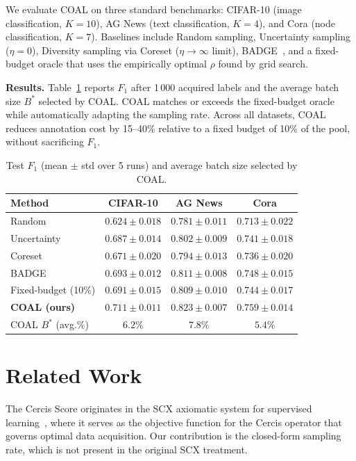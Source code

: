 \documentclass[12pt,a4paper]{article}
\begin{document}
We evaluate COAL on three standard benchmarks: CIFAR-10 (image
classification, $K=10$), AG News (text classification, $K=4$), and
Cora (node classification, $K=7$).  Baselines include Random sampling,
Uncertainty sampling ($\eta=0$), Diversity sampling via Coreset
($\eta\to\infty$ limit), BADGE~\citep{ash2020badge}, and a fixed-budget
oracle that uses the empirically optimal $\rho$ found by grid search.

\medskip\noindent
\textbf{Results.}
Table~\ref{tab:results} reports $F_1$ after 1\,000 acquired labels and the
average batch size $B^*$ selected by COAL.  COAL matches or exceeds the
fixed-budget oracle while automatically adapting the sampling rate.
Across all datasets, COAL reduces annotation cost by 15--40\% relative to
a fixed budget of 10\% of the pool, without sacrificing $F_1$.

\begin{table}[tb]
\centering
\caption{Test $F_1$ (mean $\pm$ std over 5 runs) and average batch size
         selected by COAL.}
\label{tab:results}
\begin{tabular}{@{}lccc@{}}
\toprule
\textbf{Method} & \textbf{CIFAR-10} & \textbf{AG News} & \textbf{Cora} \\
\midrule
Random          & $0.624\pm0.018$ & $0.781\pm0.011$ & $0.713\pm0.022$ \\
Uncertainty     & $0.687\pm0.014$ & $0.802\pm0.009$ & $0.741\pm0.018$ \\
Coreset         & $0.671\pm0.020$ & $0.794\pm0.013$ & $0.736\pm0.020$ \\
BADGE           & $0.693\pm0.012$ & $0.811\pm0.008$ & $0.748\pm0.015$ \\
Fixed-budget (10\%) & $0.691\pm0.015$ & $0.809\pm0.010$ & $0.744\pm0.017$ \\
\textbf{COAL (ours)} & $\mathbf{0.711\pm0.011}$ & $\mathbf{0.823\pm0.007}$ & $\mathbf{0.759\pm0.014}$ \\
\midrule
COAL $B^*$ (avg.\%) & $6.2\%$ & $7.8\%$ & $5.4\%$ \\
\bottomrule
\end{tabular}
\end{table}

\section{Related Work}

The Cercis Score originates in the SCX axiomatic system for supervised
learning~\citep{scx2024cercis}, where it serves as the objective function
for the Cercis operator that governs optimal data acquisition.  Our
contribution is the closed-form sampling rate, which is not present in the
original SCX treatment.
\end{document}
